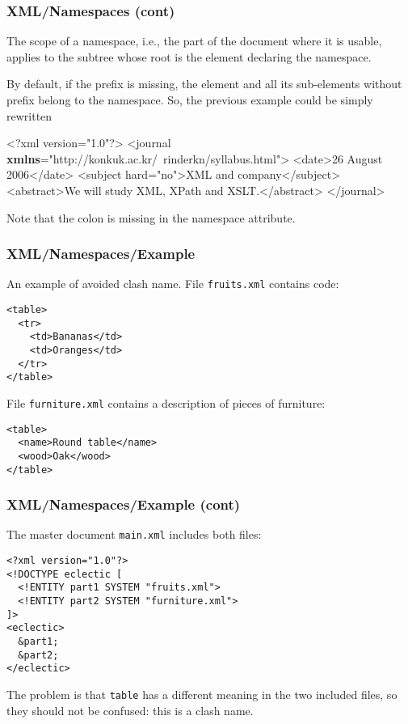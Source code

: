 %
\begin{frame}[containsverbatim]
\frametitle{XML/Namespaces (cont)}

The scope of a namespace, i.e., the part of the document where it is
 usable, applies to the subtree whose root is the element declaring
 the namespace.

\bigskip

By default, if the prefix is missing, the element and all its
sub-elements without prefix belong to the namespace. So, the
previous example could be simply rewritten {\small
\begin{semiverbatim}
<?xml version="1.0"?>
<journal \textbf{xmlns}="http://konkuk.ac.kr/~rinderkn/syllabus.html">
 <date>26 August 2006</date>
 <subject hard="no">XML and company</subject>
 <abstract>We will study XML, XPath and XSLT.</abstract>
</journal>
\end{semiverbatim}
}
Note that the colon is missing in the namespace attribute.

\end{frame}

%
\begin{frame}[containsverbatim]
\frametitle{XML/Namespaces/Example}

An example of avoided clash name. File \texttt{fruits.xml} contains
\HTML code:
\begin{verbatim}
<table>
  <tr>
    <td>Bananas</td>
    <td>Oranges</td>
  </tr>
</table>
\end{verbatim}
File \texttt{furniture.xml} contains a description of pieces of
furniture:
\begin{verbatim}
<table>
  <name>Round table</name>
  <wood>Oak</wood>
</table>
\end{verbatim}

\end{frame}

%
\begin{frame}[containsverbatim]
\frametitle{XML/Namespaces/Example (cont)}

The master document \texttt{main.xml} includes both files:
\begin{verbatim}
<?xml version="1.0"?>
<!DOCTYPE eclectic [
  <!ENTITY part1 SYSTEM "fruits.xml">
  <!ENTITY part2 SYSTEM "furniture.xml">
]>
<eclectic>
  &part1;
  &part2;
</eclectic>
\end{verbatim}
The problem is that \texttt{table} has a different meaning in the two
included files, so they should not be confused: this is a clash name.

\end{frame}

